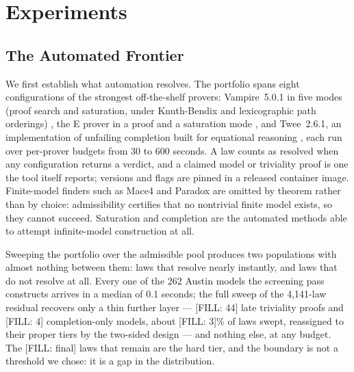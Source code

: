 
\section{Experiments}

\subsection{The Automated Frontier}

We first establish what automation resolves. The portfolio spans eight
configurations of the strongest off-the-shelf provers: Vampire~5.0.1 in five
modes (proof search and saturation, under Knuth-Bendix and lexicographic path
orderings) \citep{kovacs2013first}, the E prover in a proof and a saturation
mode \citep{schulz2019faster}, and Twee~2.6.1, an implementation of unfailing
completion built for equational reasoning \citep{smallbone2021twee}, each run
over per-prover budgets from 30 to 600 seconds. A law counts as resolved when
any configuration returns a verdict, and a claimed model or triviality proof
is one the tool itself reports; versions and flags are pinned in a released
container image. Finite-model finders such as Mace4 and Paradox are omitted
by theorem rather than by choice: admissibility certifies that no nontrivial
finite model exists, so they cannot succeed. Saturation and completion are
the automated methods able to attempt infinite-model construction at all.

Sweeping the portfolio over the admissible pool produces two populations
with almost nothing between them: laws that resolve nearly instantly, and
laws that do not resolve at all. Every one of the 262 Austin models the
screening pass constructs arrives in a median of 0.1 seconds; the full
sweep of the 4,141-law residual recovers only a thin further layer —
[FILL: 44] late triviality proofs and [FILL: 4] completion-only models,
about [FILL: 3]\% of laws swept, reassigned to their proper tiers by the
two-sided design — and nothing else, at any budget. The [FILL: final] laws
that remain are the hard tier, and the boundary is not a threshold we chose:
it is a gap in the distribution.


